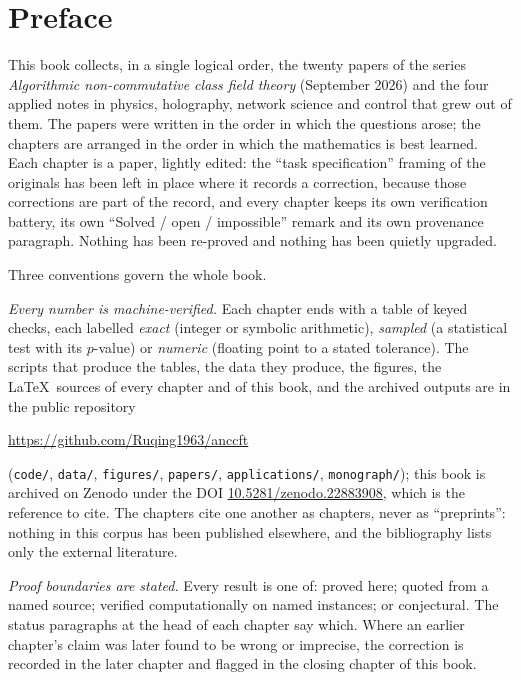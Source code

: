 \chapter*{Preface}

This book collects, in a single logical order, the twenty papers of the series
\emph{Algorithmic non-commutative class field theory} (September 2026) and the four
applied notes in physics, holography, network science and control that grew out of them.
The papers were written in the order in which the questions arose; the chapters are
arranged in the order in which the mathematics is best learned. Each chapter is a paper,
lightly edited: the ``task specification'' framing of the originals has been left in place
where it records a correction, because those corrections are part of the record, and every
chapter keeps its own verification battery, its own ``Solved / open / impossible'' remark
and its own provenance paragraph. Nothing has been re-proved and nothing has been quietly
upgraded.

Three conventions govern the whole book.

\emph{Every number is machine-verified.} Each chapter ends with a table of keyed
checks, each labelled \emph{exact} (integer or symbolic arithmetic), \emph{sampled}
(a statistical test with its $p$-value) or \emph{numeric} (floating point to a stated
tolerance). The scripts that produce the tables, the data they produce, the figures, the
\LaTeX\ sources of every chapter and of this book, and the archived outputs are in the
public repository
\begin{center}
\url{https://github.com/Ruqing1963/anccft}
\end{center}
(\texttt{code/}, \texttt{data/}, \texttt{figures/}, \texttt{papers/},
\texttt{applications/}, \texttt{monograph/}); this book is archived on Zenodo under the DOI
\href{https://doi.org/10.5281/zenodo.22883908}{10.5281/zenodo.22883908}, which is the
reference to cite. The chapters cite
one another as chapters, never as ``preprints'': nothing in this corpus has been
published elsewhere, and the bibliography lists only the external literature.

\emph{Proof boundaries are stated.} Every result is one of: proved here; quoted from a
named source; verified computationally on named instances; or conjectural. The status
paragraphs at the head of each chapter say which. Where an earlier chapter's claim was
later found to be wrong or imprecise, the correction is recorded in the later chapter and
flagged in the closing chapter of this book.

